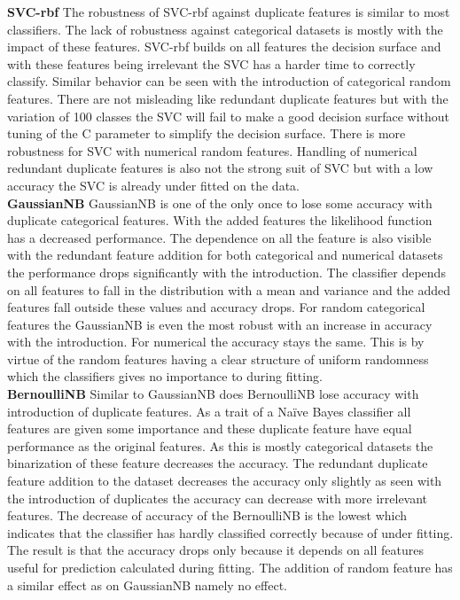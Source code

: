 \documentclass[a4paper,10pt]{article}
\begin{document}
\textbf{SVC-rbf} The robustness of SVC-rbf against duplicate features is similar to most classifiers. The lack of robustness against categorical datasets is mostly with the impact of these features. SVC-rbf builds on all features the decision surface and with these features being irrelevant the SVC has a harder time to correctly classify. Similar behavior can be seen with the introduction of categorical random features. There are not misleading like redundant duplicate features but with the variation of 100 classes the SVC will fail to make a good decision surface without tuning of the C parameter to simplify the decision surface. There is more robustness for SVC with numerical random features. Handling of numerical redundant duplicate features is also not the strong suit of SVC but with a low accuracy the SVC is already under fitted on the data.  \\

\textbf{GaussianNB} GaussianNB is one of the only once to lose some accuracy with duplicate categorical features. With the added features the likelihood function has a decreased performance. The dependence on all the feature is also visible with the redundant feature addition for both categorical and numerical datasets the performance drops significantly with the introduction. The classifier depends on all features to fall in the distribution with a mean and variance and the added features fall outside these values and accuracy drops. For random categorical features the GaussianNB is even the most robust with an increase in accuracy with the introduction. For numerical the accuracy stays the same. This is by virtue of the random features having a clear structure of uniform randomness which the classifiers gives no importance to during fitting.   \\

\textbf{BernoulliNB} Similar to GaussianNB does BernoulliNB lose accuracy with introduction of duplicate features. As a trait of a Naïve Bayes classifier all features are given some importance and these duplicate feature have equal performance as the original features. As this is mostly categorical datasets  the binarization of these feature decreases the accuracy. The redundant duplicate feature addition to the dataset decreases the accuracy only slightly as seen with the introduction of duplicates the accuracy can decrease with more irrelevant features. The decrease of accuracy of the BernoulliNB is the lowest which indicates that the classifier has hardly classified correctly because of under fitting. The result is that the accuracy drops only because it depends on all features useful for prediction calculated during fitting. The addition of random feature has a similar effect as on GaussianNB namely no effect. \\
\end{document}
